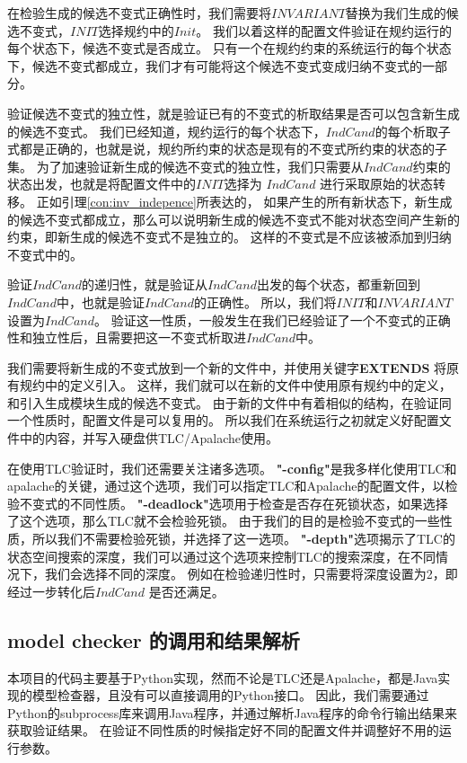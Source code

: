 在检验生成的候选不变式正确性时，我们需要将$INVARIANT$替换为我们生成的候选不变式，$INIT$选择规约中的$Init$。
我们以着这样的配置文件验证在规约运行的每个状态下，候选不变式是否成立。
只有一个在规约约束的系统运行的每个状态下，候选不变式都成立，我们才有可能将这个候选不变式变成归纳不变式的一部分。

验证候选不变式的独立性，就是验证已有的不变式的析取结果是否可以包含新生成的候选不变式。
我们已经知道，规约运行的每个状态下，$IndCand$的每个析取子式都是正确的，也就是说，规约所约束的状态是现有的不变式所约束的状态的子集。
为了加速验证新生成的候选不变式的独立性，我们只需要从$IndCand$约束的状态出发，也就是将配置文件中的$INIT$选择为 $IndCand$ 进行采取原始的状态转移。
正如引理\ref{con:inv_indepence}所表达的，
如果产生的所有新状态下，新生成的候选不变式都成立，那么可以说明新生成的候选不变式不能对状态空间产生新的约束，即新生成的候选不变式不是独立的。
这样的不变式是不应该被添加到归纳不变式中的。

验证$IndCand$的递归性，就是验证从$IndCand$出发的每个状态，都重新回到$IndCand$中，也就是验证$IndCand$的正确性。
所以，我们将$INIT$和$INVARIANT$设置为$IndCand$。
验证这一性质，一般发生在我们已经验证了一个不变式的正确性和独立性后，且需要把这一不变式析取进$IndCand$中。

我们需要将新生成的不变式放到一个新的文件中，并使用关键字\textbf{EXTENDS} 将原有规约中的定义引入。
这样，我们就可以在新的文件中使用原有规约中的定义，和引入生成模块生成的候选不变式。
由于新的\TLA 文件中有着相似的结构，在验证同一个性质时，配置文件是可以复用的。
所以我们在系统运行之初就定义好配置文件中的内容，并写入硬盘供TLC/Apalache使用。

在使用TLC验证时，我们还需要关注诸多选项。
\textbf{"-config"}是我多样化使用TLC和apalache的关键，通过这个选项，我们可以指定TLC和Apalache的配置文件，以检验不变式的不同性质。
\textbf{"-deadlock"}选项用于检查是否存在死锁状态，如果选择了这个选项，那么TLC就不会检验死锁。
由于我们的目的是检验不变式的一些性质，所以我们不需要检验死锁，并选择了这一选项。
\textbf{"-depth"}选项揭示了TLC的状态空间搜索的深度，我们可以通过这个选项来控制TLC的搜索深度，在不同情况下，我们会选择不同的深度。
例如在检验递归性时，只需要将深度设置为2，即经过一步转化后$IndCand$ 是否还满足。

\subsection{model checker 的调用和结果解析}
本项目的代码主要基于Python实现，然而不论是TLC还是Apalache，都是Java实现的模型检查器，且没有可以直接调用的Python接口。
因此，我们需要通过Python的subprocess库来调用Java程序，并通过解析Java程序的命令行输出结果来获取验证结果。
在验证不同性质的时候指定好不同的配置文件并调整好不用的运行参数。

